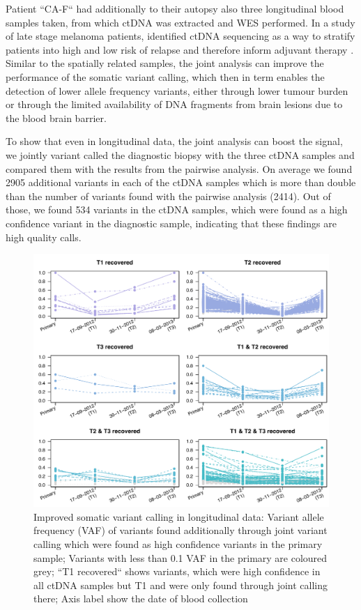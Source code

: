 Patient ``CA-F`` had additionally to their autopsy also three longitudinal blood samples taken, from which ctDNA was extracted and WES performed. In a study of late stage melanoma patients,  identified ctDNA sequencing as a way to stratify patients into high and low risk of relapse and therefore inform adjuvant therapy \cite{Tan2019}. Similar to the spatially related samples, the joint analysis can improve the performance of the somatic variant calling, which then in term enables the detection of lower allele frequency variants, either through lower tumour burden or through the limited availability of DNA fragments from brain lesions due to the blood brain barrier\cite{2014}.

To show that even in longitudinal data, the joint analysis can boost the signal, we jointly variant called the diagnostic biopsy with the three ctDNA samples and compared them with the results from the pairwise analysis. On average we found 2905 additional variants in each of the ctDNA samples which is more than double than the number of variants found with the pairwise analysis (2414). Out of those, we found 534 variants in the ctDNA samples, which were found as a high confidence variant in the diagnostic sample, indicating that these findings are high quality calls. 

\begin{figure}[!ht]
\centering
\includegraphics[width=.99\linewidth]{Figures/longitudinalCA9ctDNAVafs.pdf}
\caption[Improved somatic variant calling in longitudinal data]{Improved somatic variant calling in longitudinal data: Variant allele frequency (VAF) of variants found additionally through joint variant calling which were found as high confidence variants in the primary sample; Variants with less than 0.1 VAF in the primary are coloured grey; ``T1 recovered`` shows variants, which were high confidence in all ctDNA samples but T1 and were only found through joint calling there; Axis label show the date of blood collection }\label{fig:longitudinalVAFsctDNA}
\end{figure}


